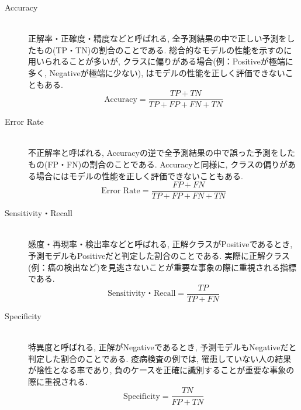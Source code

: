 \documentclass{ltjarticle}
\begin{document}
\begin{description}
    \item[Accuracy]\mbox{}\\
    正解率・正確度・精度などと呼ばれる, 全予測結果の中で正しい予測をしたもの(TP・TN)の割合のことである. 総合的なモデルの性能を示すのに用いられることが多いが, 
    クラスに偏りがある場合(例：Positiveが極端に多く, Negativeが極端に少ない), はモデルの性能を正しく評価できないこともある. \\
    \begin{equation}
        \textrm{Accuracy} = \dfrac{TP+TN}{TP+FP+FN+TN}
        \label{equation:Accuracy}
    \end{equation}
    \vspace{5truept}

    \item[Error Rate] \mbox{}\\
    不正解率と呼ばれる, Accuracyの逆で全予測結果の中で誤った予測をしたもの(FP・FN)の割合のことである.
    Accuracyと同様に, クラスの偏りがある場合にはモデルの性能を正しく評価できないこともある. \\
    \begin{equation}
        \textrm{Error Rate} = \dfrac{FP+FN}{TP+FP+FN+TN}
        \label{equation:Error}
    \end{equation}
    \vspace{5truept}

    \item[Sensitivity・Recall]\mbox{}\\
    感度・再現率・検出率などと呼ばれる, 正解クラスがPositiveであるとき, 予測モデルもPositiveだと判定した割合のことである. 
    実際に正解クラス(例：癌の検出など)を見逃さないことが重要な事象の際に重視される指標である. \\
    \begin{equation}
        \textrm{Sensitivity・Recall} = \dfrac{TP}{TP+FN}
        \label{equation:Recall}
    \end{equation}
    \vspace{5truept}

    \item[Specificity]\mbox{}\\  
    特異度と呼ばれる, 正解がNegativeであるとき, 予測モデルもNegativeだと判定した割合のことである. 
    疫病検査の例では, 罹患していない人の結果が陰性となる率であり, 負のケースを正確に識別することが重要な事象の際に重視される. \\
    \begin{equation}
        \textrm{Specificity} = \dfrac{TN}{FP+TN}
        \label{equation:Specificity}
    \end{equation}
    \vspace{5truept}


\end{description}
\end{document}
